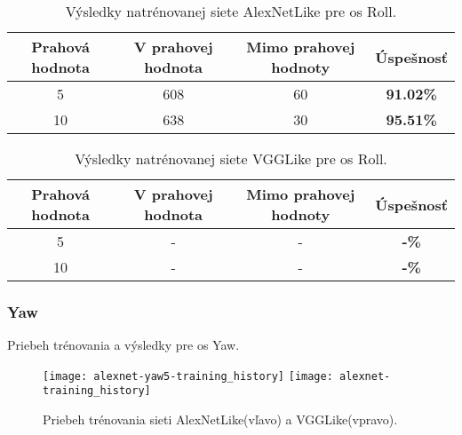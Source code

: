 \begin{table}[H]
    \centering
    \begin{tabular}{|c|c|c|c|}
        \hline
        Prahová hodnota & V prahovej hodnota       & Mimo prahovej hodnoty    & Úspešnosť    \\ \hline
        5               & {\color[HTML]{009901} 608} & {\color[HTML]{9A0000} 60} & \textbf{91.02\%} \\ \hline
        10              & {\color[HTML]{009901} 638} & {\color[HTML]{9A0000} 30} & \textbf{95.51\%} \\ \hline
    \end{tabular}
    \caption{Výsledky natrénovanej siete AlexNetLike pre os Roll.}
    \label{tab:alexnetrollresults}
\end{table}
\begin{table}[H]
    \centering
    \begin{tabular}{|c|c|c|c|}
        \hline
        Prahová hodnota & V prahovej hodnota       & Mimo prahovej hodnoty    & Úspešnosť    \\ \hline
        5               & {\color[HTML]{009901} -} & {\color[HTML]{9A0000} -} & \textbf{-\%} \\ \hline
        10              & {\color[HTML]{009901} -} & {\color[HTML]{9A0000} -} & \textbf{-\%} \\ \hline
    \end{tabular}
    \caption{Výsledky natrénovanej siete VGGLike pre os Roll.}
    \label{tab:vgglikerollresults}
\end{table}


\subsubsection{Yaw}
Priebeh trénovania a výsledky pre os Yaw.

\begin{figure}[H]
    \centering
    \texttt{[image: alexnet-yaw5-training\_history]}
	\texttt{[image: alexnet-training\_history]} %
	\caption{Priebeh trénovania sieti AlexNetLike(vľavo) a VGGLike(vpravo).}
	\label{pic:yawaxis}
\end{figure}

